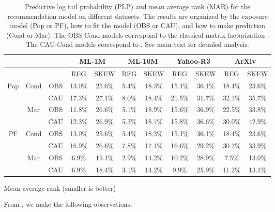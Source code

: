 \begin{table}
\begin{subtable}[t]{\textwidth}
\begin{tabular}{ c  c  c  c c  c c  c c  c c  }
  \toprule
  \multicolumn{3}{c}{} & \multicolumn{2}{c}{\textbf{ML-1M}} & \multicolumn{2}{c}{\textbf{ML-10M}} & \multicolumn{2}{c}{\textbf{Yahoo-R3}} & \multicolumn{2}{c}{\textbf{ArXiv}} \\ \midrule
  \multicolumn{2}{c}{} & & REG & SKEW & REG & SKEW  & REG & SKEW & REG & SKEW  \\ \midrule
  \multirow{4}{*}{Pop} & \multirow{2}{*}{Cond} & OBS & 13.0\% & 25.6\% &
  5.4\% & 18.3\% & 15.1\% & 36.1\% & 18.4\% & 23.6\% \\ 
  & & CAU & 17.3\% & 27.1\% & 8.0\% & 18.4\% & 21.5\% & 31.7\% & 32.1\% & 35.7\% \\ \cmidrule{2-11}
  & \multirow{2}{*}{Mar} & OBS & 11.8\% & 26.6\% & 5.1\% & 18.9\% & 15.6\% & 36.9\% & 22.5\% & 33.8\%\\
  & & CAU & 12.3\% & 26.9\% & 5.3\% & 18.7\% & 15.8\% & 36.6\% & 30.0\%  & 42.9\% \\ \midrule
  \multirow{4}{*}{PF} & \multirow{2}{*}{Cond} & OBS & 13.0\% & 25.6\% &
  5.4\% & 18.3\% & 15.1\% & 36.1\% & 18.4\% & 23.6\% \\
  & & CAU & 16.9\% & 26.6\% & 7.8\% & 17.1\% & 16.6\% & 29.2\% & 30.7\% & 33.9\%\\ \cmidrule{2-11}
  & \multirow{2}{*}{Mar} & OBS & 6.9\% & 19.1\% & 2.9\% & 14.2\% & 10.2\% & 28.9\% & 7.5\% & 13.0\%\\
  & & CAU & 6.9\% & 18.4\% & 3.1\% & 14.2\% & 9.9\% & 25.9\% & 11.2\% & 13.1\% \\ \bottomrule
\end{tabular}
\caption{Mean average rank (smaller is better)}
\label{tab:eval_mar}
\end{subtable}
\caption{Predictive log tail probability (PLP) and mean average rank (MAR) for the recommendation model on different datasets. The results are organized by the exposure model (Pop or PF), how to fit the model (OBS or CAU), and how to make prediction (Cond or Mar). The OBS-Cond models correspond to the classical matrix factorization \citep{mnih2007probabilistic}. The CAU-Cond models correspond to \citet{schnabel16treatment}. See main text for detailed analysis. }
\label{tab:results}
\end{table}

From , we make the following observations.

